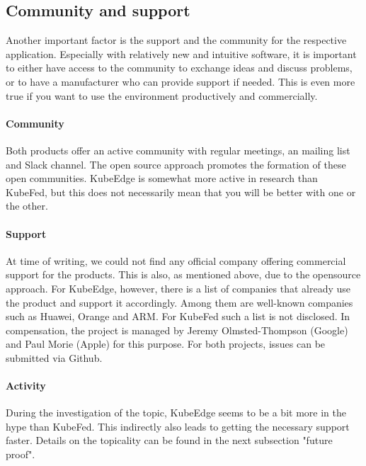 \documentclass[MSC,Master,english]{twbook}%
\begin{document}
\subsection{Community and support}
Another important factor is the support and the community for the respective application. Especially with relatively new and intuitive software, it is important to either have access to the community to exchange ideas and discuss problems, or to have a manufacturer who can provide support if needed. This is even more true if you want to use the environment productively and commercially.

\paragraph{Community} Both products offer an active community with regular meetings, an mailing list and Slack channel. The open source approach promotes the formation of these open communities. KubeEdge is somewhat more active in research than KubeFed, but this does not necessarily mean that you will be better with one or the other.

\paragraph{Support} At time of writing, we could not find any official company offering commercial support for the products. This is also, as mentioned above, due to the opensource approach. For KubeEdge, however, there is a list of companies that already use the product and support it accordingly. Among them are well-known companies such as Huawei, Orange and ARM. For KubeFed such a list is not disclosed. In compensation, the project is managed by Jeremy Olmsted-Thompson (Google) and Paul Morie (Apple) for this purpose. For both projects, issues can be submitted via Github.

\paragraph{Activity} During the investigation of the topic, KubeEdge seems to be a bit more in the hype than KubeFed. This indirectly also leads to getting the necessary support faster. Details on the topicality can be found in the next subsection "future proof".
\end{document}
